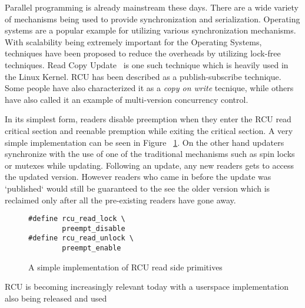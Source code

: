 Parallel programming is already mainstream these days. There are a wide variety
of mechanisms being used to provide synchronization and serialization.
Operating systems are a popular example for utilizing various synchronization
mechanisms. %
With scalability being extremely important for the Operating Systems,
techniques have been proposed to reduce the overheads by utilizing lock-free
techniques. Read Copy Update~\cite{paulmck:TechReport} is one such technique which is
heavily used in the Linux Kernel. RCU has been described as a publish-subscribe
technique. Some people have also characterized it as a \emph{copy on write} tecnique, while
others have also called it an example of multi-version concurrency control.

In its simplest form, readers disable preemption when they enter the RCU read critical
section and reenable premption while exiting the
critical section. A very simple implementation can be seen in Figure ~\ref{fig:rcusimpleread}.
On the other hand updaters synchronize with the use
of one of the traditional mechanisms such as spin locks or mutexes while updating.
Following an update, any new readers gets to access the updated version. However
readers who came in before the update was `published` would still be guaranteed
to the see the older version which is reclaimed only after all the pre-existing
readers have gone away.

\begin{figure}[b]
\centering
\begin{lstlisting}
#define rcu_read_lock \
		preempt_disable
#define rcu_read_unlock \
		preempt_enable
\end{lstlisting}
\caption{A simple implementation of RCU read side primitives}\label{fig:rcusimpleread}
\end{figure}

RCU is becoming increasingly relevant today with a userspace implementation also
being released and used~\cite{urcu}~\cite{goulet:thesis}~\cite{urcu-crowd}


